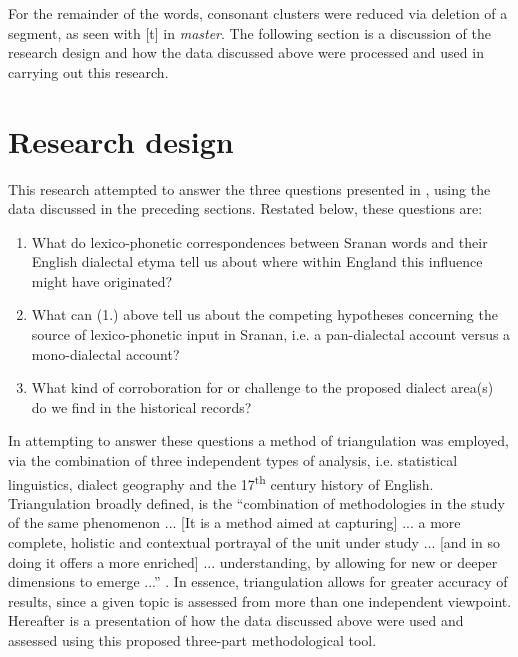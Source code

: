 {{{{{{{{{For the remainder of the words, consonant clusters were reduced via deletion of a segment, as seen with [t] in \textipa{[masra]} \emph{master}. The following section is a discussion of the research design and how the data discussed above were processed and used in carrying out this research.

\section{Research design}
This research attempted to answer the three questions presented in , using the data discussed in the preceding sections. Restated below, these questions are:

\begin{enumerate}
\item {What do lexico-phonetic correspondences between Sranan words and their English dialectal etyma tell us about where within England this influence might have originated?}
\item{What can (1.) above tell us about the competing hypotheses concerning the source of lexico-phonetic input in Sranan, i.e. a pan-dialectal account versus a mono-dialectal account?}
\item{What kind of corroboration for or challenge to the proposed dialect area(s) do we find in the historical records?}
\end{enumerate}

In attempting to answer these questions a method of triangulation was employed, via the combination of three independent types of analysis, i.e. statistical linguistics, dialect geography and the 17\textsuperscript{th} century history of English. Triangulation broadly defined, is the ``combination of methodologies in the study of the same phenomenon ... [It is a method aimed at capturing] ... a more complete, holistic and contextual portrayal of the unit under study ... [and in so doing it offers a more enriched] ... understanding, by allowing for new or deeper dimensions to emerge ...'' \citep[603--604]{Denzin78}. In essence, triangulation allows for greater accuracy of results, since a given topic is assessed from more than one independent viewpoint. Hereafter is a presentation of how the data discussed above were used and assessed using this proposed three-part methodological tool.

}}}}}}}}}

